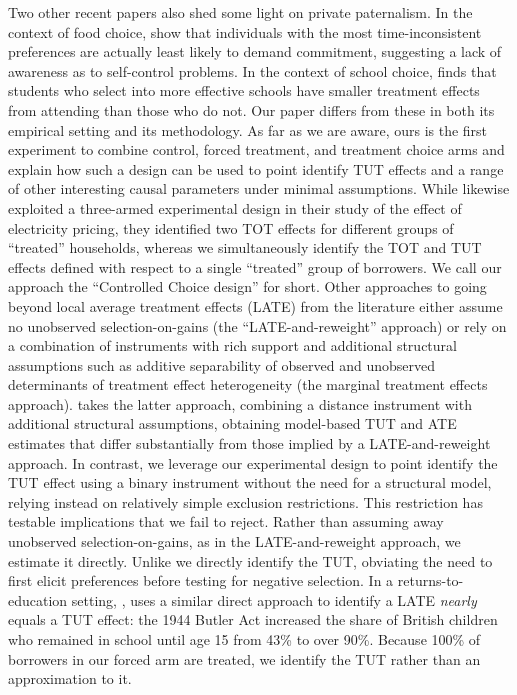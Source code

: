 \documentclass[oneside,11pt]{article}
\begin{document}
Two other recent papers also shed some light on private paternalism. In the context of food choice, \cite{Sprenger} show that individuals with the most time-inconsistent preferences are actually least likely to demand commitment, suggesting a lack of awareness as to self-control problems. In the context of school choice, \cite{Walters} finds that students who select into more effective schools have smaller treatment effects from attending than those who do not.
Our paper differs from these in both its empirical setting and its methodology.
As far as we are aware, ours is the first experiment to combine control, forced treatment, and treatment choice arms and explain how such a design can be used to point identify TUT effects and a range of other interesting causal parameters under minimal assumptions.
While \cite{fowlie2021default} likewise exploited a three-armed experimental design in their study of the effect of electricity pricing, they identified two TOT effects for different groups of ``treated'' households, whereas we simultaneously identify the TOT and TUT effects defined with respect to a single ``treated'' group of borrowers.
We call our approach the ``Controlled Choice design'' for short.
Other approaches to going beyond local average treatment effects (LATE) from the literature either assume no unobserved selection-on-gains \citep{aronow2013beyond,angrist2013extrapolate} (the ``LATE-and-reweight'' approach) or rely on a combination of instruments with rich support and additional structural assumptions such as additive separability of observed and unobserved determinants of treatment effect heterogeneity \citep{heckman2007econometric, cornelissen2018benefits} (the marginal treatment effects approach).
\cite{Walters} takes the latter approach, combining a distance instrument with additional structural assumptions, obtaining model-based TUT and ATE estimates that differ substantially from those implied by a LATE-and-reweight approach. 
In contrast, we leverage our experimental design to point identify the TUT effect using a binary instrument without the need for a structural model, relying instead on relatively simple exclusion restrictions. This restriction has testable implications that we fail to reject. Rather than assuming away unobserved selection-on-gains, as in the LATE-and-reweight approach, we estimate it directly.
Unlike \cite{Sprenger} we directly identify the TUT, obviating the need to first elicit preferences before testing for negative selection.
In a returns-to-education setting, \cite{oreopoulos2006estimating}, uses a similar direct approach to identify a LATE \emph{nearly} equals a TUT effect: the 1944 Butler Act increased the share of British children who remained in school until age 15 from 43\% to over 90\%. Because 100\% of borrowers in our forced arm are treated, we identify the TUT rather than an approximation to it.
\end{document}
